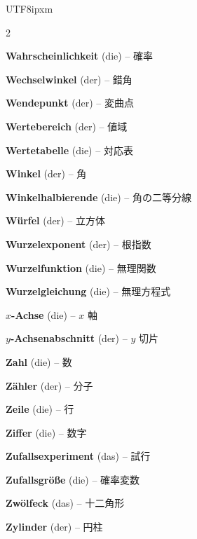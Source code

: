 \begin{CJK}{UTF8}{ipxm}
\begin{multicols}{2}
\par\nopagebreak
\textbf{Wahrscheinlichkeit} (die) -- 確率\dotfill\hyperref[e:330]{\pageref*{e:330}}\par
\textbf{Wechselwinkel} (der) -- 錯角\dotfill\hyperref[e:168]{\pageref*{e:168}}\par
\textbf{Wendepunkt} (der) -- 変曲点\dotfill\hyperref[e:284]{\pageref*{e:284}}\par
\textbf{Wertebereich} (der) -- 値域\dotfill\hyperref[e:110]{\pageref*{e:110}}\par
\textbf{Wertetabelle} (die) -- 対応表\dotfill\hyperref[e:112]{\pageref*{e:112}}\par
\textbf{Winkel} (der) -- 角\dotfill\hyperref[e:153]{\pageref*{e:153}}\par
\textbf{Winkelhalbierende} (die) -- 角の二等分線\dotfill\hyperref[e:156]{\pageref*{e:156}}\par
\textbf{Würfel} (der) -- 立方体\dotfill\hyperref[e:226]{\pageref*{e:226}}\par
\textbf{Wurzelexponent} (der) -- 根指数\dotfill\hyperref[e:49]{\pageref*{e:49}}\par
\textbf{Wurzelfunktion} (die) -- 無理関数\dotfill\hyperref[e:128]{\pageref*{e:128}}\par
\textbf{Wurzelgleichung} (die) -- 無理方程式\dotfill\hyperref[e:83]{\pageref*{e:83}}\par

\par\nopagebreak
\textbf{$x$-Achse} (die) -- $x$ 軸\dotfill\hyperref[e:114]{\pageref*{e:114}}\par

\par\nopagebreak
\textbf{$y$-Achsenabschnitt} (der) -- $y$ 切片\dotfill\hyperref[e:121]{\pageref*{e:121}}\par

\par\nopagebreak
\textbf{Zahl} (die) -- 数\dotfill\hyperref[e:1]{\pageref*{e:1}}\par
\textbf{Zähler} (der) -- 分子\dotfill\hyperref[e:29]{\pageref*{e:29}}\par
\textbf{Zeile} (die) -- 行\dotfill\hyperref[e:322]{\pageref*{e:322}}\par
\textbf{Ziffer} (die) -- 数字\dotfill\hyperref[e:2]{\pageref*{e:2}}\par
\textbf{Zufallsexperiment} (das) -- 試行\dotfill\hyperref[e:326]{\pageref*{e:326}}\par
\textbf{Zufallsgröße} (die) -- 確率変数\dotfill\hyperref[e:334]{\pageref*{e:334}}\par
\textbf{Zwölfeck} (das) -- 十二角形\dotfill\hyperref[e:208]{\pageref*{e:208}}\par
\textbf{Zylinder} (der) -- 円柱\dotfill\hyperref[e:229]{\pageref*{e:229}}\par
\end{multicols}


\end{CJK}
